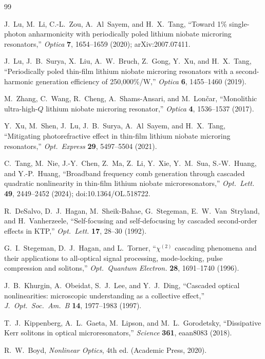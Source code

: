 \documentclass[11pt,a4paper]{article}
\begin{document}
\begin{thebibliography}{99}

J.~Lu, M.~Li, C.-L.~Zou, A.~Al~Sayem, and H.~X.~Tang,
``Toward 1\% single-photon anharmonicity with periodically poled lithium
niobate microring resonators,''
\emph{Optica} \textbf{7}, 1654--1659 (2020); arXiv:2007.07411.

J.~Lu, J.~B.~Surya, X.~Liu, A.~W.~Bruch, Z.~Gong, Y.~Xu, and H.~X.~Tang,
``Periodically poled thin-film lithium niobate microring resonators with
a second-harmonic generation efficiency of 250,000\%/W,''
\emph{Optica} \textbf{6}, 1455--1460 (2019).

M.~Zhang, C.~Wang, R.~Cheng, A.~Shams-Ansari, and M.~Lon\v{c}ar,
``Monolithic ultra-high-$Q$ lithium niobate microring resonator,''
\emph{Optica} \textbf{4}, 1536--1537 (2017).

Y.~Xu, M.~Shen, J.~Lu, J.~B.~Surya, A.~Al~Sayem, and H.~X.~Tang,
``Mitigating photorefractive effect in thin-film lithium niobate
microring resonators,''
\emph{Opt.\ Express} \textbf{29}, 5497--5504 (2021).

C.~Tang, M.~Nie, J.-Y.~Chen, Z.~Ma, Z.~Li, Y.~Xie, Y.~M.~Sua,
S.-W.~Huang, and Y.-P.~Huang,
``Broadband frequency comb generation through cascaded quadratic
nonlinearity in thin-film lithium niobate microresonators,''
\emph{Opt.\ Lett.} \textbf{49}, 2449--2452 (2024);
doi:10.1364/OL.518722.

R.~DeSalvo, D.~J.~Hagan, M.~Sheik-Bahae, G.~Stegeman, E.~W.~Van~Stryland,
and H.~Vanherzeele,
``Self-focusing and self-defocusing by cascaded second-order effects in
KTP,''
\emph{Opt.\ Lett.} \textbf{17}, 28--30 (1992).

G.~I.~Stegeman, D.~J.~Hagan, and L.~Torner,
``$\chi^{(2)}$ cascading phenomena and their applications to all-optical
signal processing, mode-locking, pulse compression and solitons,''
\emph{Opt.\ Quantum Electron.} \textbf{28}, 1691--1740 (1996).

J.~B.~Khurgin, A.~Obeidat, S.~J.~Lee, and Y.~J.~Ding,
``Cascaded optical nonlinearities: microscopic understanding as a
collective effect,''
\emph{J.\ Opt.\ Soc.\ Am.\ B} \textbf{14}, 1977--1983 (1997).

T.~J.~Kippenberg, A.~L.~Gaeta, M.~Lipson, and M.~L.~Gorodetsky,
``Dissipative Kerr solitons in optical microresonators,''
\emph{Science} \textbf{361}, eaan8083 (2018).

R.~W.~Boyd, \emph{Nonlinear Optics}, 4th ed. (Academic Press, 2020).

\end{thebibliography}
\end{document}
